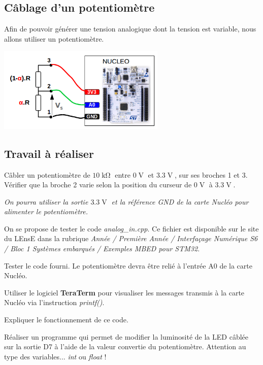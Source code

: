 \documentclass[a4paper,11pt,titlepage]{article} %
\begin{document}
\subsection{Câblage d'un potentiomètre}

Afin de pouvoir générer une tension analogique dont la tension est variable, nous allons utiliser un potentiomètre.

\begin{center}
	\includegraphics[width=0.6\textwidth]{images/MINE_Nucleo_CablagePotentiometre.png}
\end{center}


\subsection{Travail à réaliser}

\Manip Câbler un potentiomètre de $10\operatorname{k\Omega}$ entre $0\operatorname{V}$ et $3.3\operatorname{V}$, sur ses broches 1 et 3. Vérifier que la broche 2 varie selon la position du curseur de $0\operatorname{V}$ à $3.3\operatorname{V}$.

\textit{On pourra utiliser la sortie $3.3\operatorname{V}$ et la référence \textit{GND} de la carte Nucléo pour alimenter le potentiomètre.}

\bigskip

On se propose de tester le code \textsl{analog\_in.cpp}. Ce fichier est disponible sur le site du LEnsE dans la rubrique \textit{Année / Première Année / Interfaçage Numérique S6 / Bloc 1 Systèmes embarqués / Exemples MBED pour STM32}.

\Manip Tester le code fourni. Le potentiomètre devra être relié à l'entrée A0 de la carte Nucléo.

\Manip Utiliser le logiciel \textbf{TeraTerm} pour visualiser les messages transmis à la carte Nucléo via l'instruction \textsl{printf()}.

\Quest Expliquer le fonctionnement de ce code.

\Manip Réaliser un programme qui permet de modifier la luminosité de la LED câblée sur la sortie D7 à l'aide de la valeur convertie du potentiomètre. Attention au type des variables... \textit{int} ou \textit{float} !
\end{document}
